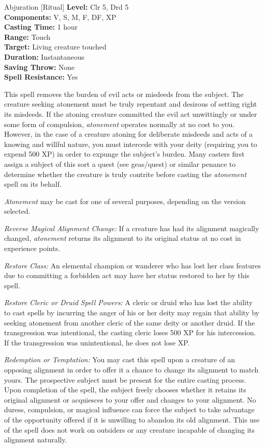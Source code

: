 {Abjuration [Ritual]}
{
	\textbf{Level:}
	Clr 5, Drd 5\\
	\textbf{Components:}
	V, S, M, F, DF, XP\\
	\textbf{Casting Time:}
	1 hour\\
	\textbf{Range:}
	Touch\\
	\textbf{Target:}
	Living creature touched\\
	\textbf{Duration:}
	Instantaneous\\
	\textbf{Saving Throw:}
	None\\
	\textbf{Spell Resistance:}
	Yes\\
}
{
	This spell removes the burden of evil acts or misdeeds from the subject. The creature seeking atonement must be truly repentant and desirous of setting right its misdeeds. If the atoning creature committed the evil act unwittingly or under some form of compulsion, \emph{atonement} operates normally at no cost to you. However, in the case of a creature atoning for deliberate misdeeds and acts of a knowing and willful nature, you must intercede with your deity (requiring you to expend 500 XP) in order to expunge the subject's burden. Many casters first assign a subject of this sort a quest (see geas/quest) or similar penance to determine whether the creature is truly contrite before casting the \emph{atonement} spell on its behalf.

	\emph{Atonement} may be cast for one of several purposes, depending on the version selected.

	\textit{Reverse Magical Alignment Change:}
	If a creature has had its alignment magically changed, \emph{atonement} returns its alignment to its original status at no cost in experience points.

	\textit{Restore Class:}
	An elemental champion or wanderer who has lost her class features due to committing a forbidden act may have her status restored to her by this spell.

	\textit{Restore Cleric or Druid Spell Powers:}
	A cleric or druid who has lost the ability to cast spells by incurring the anger of his or her deity may regain that ability by seeking atonement from another cleric of the same deity or another druid. If the transgression was intentional, the casting cleric loses 500 XP for his intercession. If the transgression was unintentional, he does not lose XP.

	\textit{Redemption or Temptation:}
	You may cast this spell upon a creature of an opposing alignment in order to offer it a chance to change its alignment to match yours. The prospective subject must be present for the entire casting process. Upon completion of the spell, the subject freely chooses whether it retains its original alignment or acquiesces to your offer and changes to your alignment. No duress, compulsion, or magical influence can force the subject to take advantage of the opportunity offered if it is unwilling to abandon its old alignment. This use of the spell does not work on outsiders or any creature incapable of changing its alignment naturally.

}
